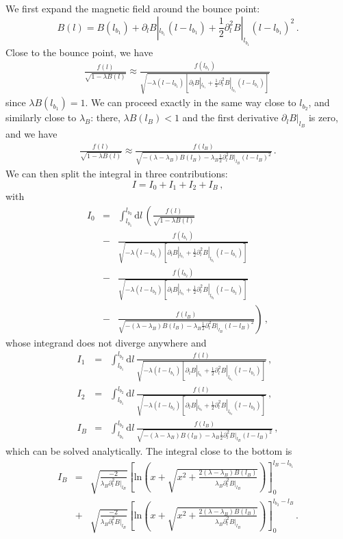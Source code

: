 We first expand the magnetic field around the bounce point:
\begin{equation} 
B(l)=B(l_{b_1})+\partial_l B|_{l_{b_1}}(l-l_{b_1})+\frac{1}{2}\partial^2_l B|_{l_{b_1}}(l-l_{b_1})^2\,.
\end{equation}
Close to the bounce point, we have
\begin{eqnarray}
\frac{f(l)}{\sqrt{1-\lambda B(l)}} \approx \frac{f(l_{b_1})}{\sqrt{-\lambda (l-l_{b_1}) [\partial_l B|_{l_{b_1}}+\frac{1}{2}\partial^2_l B|_{l_{b_1}}(l-l_{b_1})]}}\,
\end{eqnarray}
since $\lambda B(l_{b_1})=1$. We can proceed exactly in the same way close to $l_{b_2}$, and similarly close to $\lambda_B$: there, $\lambda B(l_B)<1$ and the first derivative $\partial_l B|_{l_B}$ is zero, and we have
\begin{eqnarray}
\frac{f(l)}{\sqrt{1-\lambda B(l)}} \approx \frac{f(l_B)}{\sqrt{-(\lambda-\lambda_B) B(l_B)-\lambda_B\frac{1}{2}\partial^2_l B|_{l_B}(l-l_B)^2}}\,.
\end{eqnarray}
We can then split the integral in three contributions:
\begin{equation} 
I= I_0+I_1+I_2+I_B\,,
\end{equation}
with
\begin{eqnarray}
I_0 &=&  \int_{l_{b_1}}^{l_{b_2}}\mathrm{d}l\,\left(\frac{f(l)}{\sqrt{1-\lambda B(l)}}\right.\nonumber\\
 &-&\frac{f(l_{b_1})}{\sqrt{-\lambda (l-l_{b_1}) [\partial_l B|_{l_{b_1}}+\frac{1}{2}\partial^2_l B|_{l_{b_1}}(l-l_{b_1})]}}\nonumber\\
 &-&\frac{f(l_{b_2})}{\sqrt{-\lambda (l-l_{b_2}) [\partial_l B|_{l_{b_2}}+\frac{1}{2}\partial^2_l B|_{l_{b_2}}(l-l_{b_2})]}}\nonumber\\
 &-&\left.\frac{f(l_B)}{\sqrt{-(\lambda-\lambda_B) B(l_B)-\lambda_B\frac{1}{2}\partial^2_l B|_{l_B}(l-l_B)^2}}\right)\,,
\end{eqnarray}
whose integrand does not diverge anywhere and
\begin{eqnarray} 
I_1 &=&  \int_{l_{b_1}}^{l_{b_2}}\mathrm{d}l\,\frac{f(l)}{\sqrt{-\lambda (l-l_{b_1}) [\partial_l B|_{l_{b_1}}+\frac{1}{2}\partial^2_l B|_{l_{b_1}}(l-l_{b_1})]}}\,,\nonumber\\
I_2 &=&  \int_{l_{b_1}}^{l_{b_2}}\mathrm{d}l\,\frac{f(l)}{\sqrt{-\lambda (l-l_{b_2}) [\partial_l B|_{l_{b_2}}+\frac{1}{2}\partial^2_l B|_{l_{b_2}}(l-l_{b_2})]}}\,,\nonumber\\
I_B &=&  \int_{l_{b_1}}^{l_{b_2}}\mathrm{d}l\,\frac{f(l_B)}{\sqrt{-(\lambda-\lambda_B) B(l_B)-\lambda_B\frac{1}{2}\partial^2_l B|_{l_B}(l-l_B)^2}}\,,
\end{eqnarray}
which can be solved analytically. The integral close to the bottom is
\begin{eqnarray} 
I_B &=&  \sqrt{\frac{-2}{\lambda_B\partial^2_l B|_{l_B}}} \left[\mathrm{ln}\left(x+\sqrt{x^2+\frac{2(\lambda-\lambda_B) B(l_B)}{\lambda_B\partial^2_l B|_{l_B}}}\right)\right]^{l_B-l_{b_1}}_0\nonumber\\
&+&  \sqrt{\frac{-2}{\lambda_B\partial^2_l B|_{l_B}}} \left[\mathrm{ln}\left(x+\sqrt{x^2+\frac{2(\lambda-\lambda_B) B(l_B)}{\lambda_B\partial^2_l B|_{l_B}}}\right)\right]_0^{l_{b_2}-l_B}\,.
\end{eqnarray}


